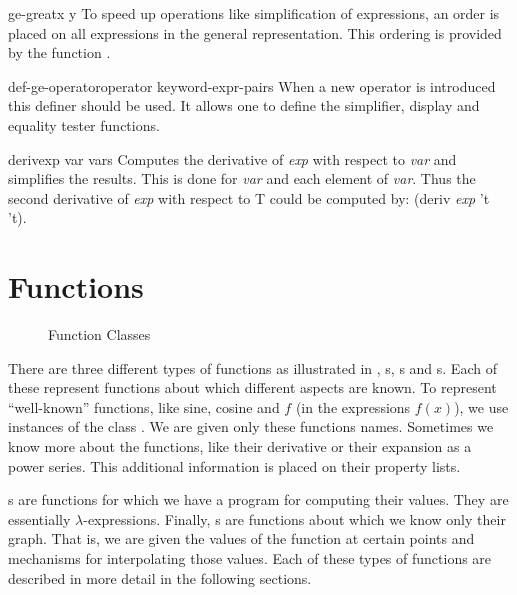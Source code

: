 \begin{functiondef}{ge-great}{x y}
To speed up operations like simplification of expressions, an order is
placed on all expressions in the general representation.  This
ordering is provided by the function .
\end{functiondef}

\begin{functiondef}{def-ge-operator}{operator \rest
keyword-expr-pairs} 
When a new operator is introduced this definer should be used.  It
allows one to define the simplifier, display and equality tester
functions.
\end{functiondef}

\begin{functiondef}{deriv}{exp var \rest vars}
Computes the derivative of {\em exp} with respect to {\em var} and
simplifies the results.  This is done for {\em var} and each element
of {\em var\/}.  Thus the second derivative of {\em exp} with respect
to {\sf T} could be computed by: {\sf (deriv {\em exp} 't 't)}.
\end{functiondef}


\section{Functions}
\label{Functions:Sec}

\begin{figure}
\begin{center}
\end{center}
\caption{Function Classes\label{FunctionClass:Fig}}
\end{figure}

There are three different types of functions as illustrated in
, s,
s and s.  Each of
these represent functions about which different aspects are known. To
represent ``well-known'' functions, like sine, cosine and $f$ (in the
expressions $f(x)$), we use instances of the class
.  We are given only these functions
names. Sometimes we know more about the functions, like their
derivative or their expansion as a power series. This additional
information is placed on their property lists.
  
s are functions for which we have a
program for computing their values. They are essentially
$\lambda$-expressions.  Finally, s are
functions about which we know only their graph.  That is, we are given
the values of the function at certain points and mechanisms for
interpolating those values.  Each of these types of functions are
described in more detail in the following sections.
  
